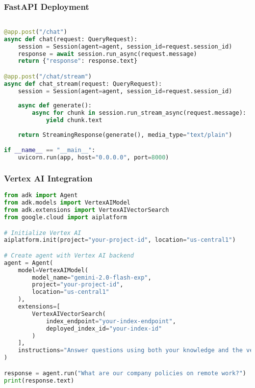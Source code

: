 \begin{frame}[fragile]\frametitle{FastAPI Deployment}
     
      \begin{lstlisting}[language=python, basicstyle=\tiny]

@app.post("/chat")
async def chat(request: QueryRequest):
    session = Session(agent=agent, session_id=request.session_id)
    response = await session.run_async(request.message)
    return {"response": response.text}

@app.post("/chat/stream")
async def chat_stream(request: QueryRequest):
    session = Session(agent=agent, session_id=request.session_id)
    
    async def generate():
        async for chunk in session.run_stream_async(request.message):
            yield chunk.text
    
    return StreamingResponse(generate(), media_type="text/plain")

if __name__ == "__main__":
    uvicorn.run(app, host="0.0.0.0", port=8000)
      \end{lstlisting}
\end{frame}

\begin{frame}[fragile]\frametitle{Vertex AI Integration}
      
      \begin{lstlisting}[language=python, basicstyle=\tiny]
from adk import Agent
from adk.models import VertexAIModel
from adk.extensions import VertexAIVectorSearch
from google.cloud import aiplatform

# Initialize Vertex AI
aiplatform.init(project="your-project-id", location="us-central1")

# Create agent with Vertex AI backend
agent = Agent(
    model=VertexAIModel(
        model_name="gemini-2.0-flash-exp",
        project="your-project-id",
        location="us-central1"
    ),
    extensions=[
        VertexAIVectorSearch(
            index_endpoint="your-index-endpoint",
            deployed_index_id="your-index-id"
        )
    ],
    instructions="Answer questions using both your knowledge and the vector store."
)

response = agent.run("What are our company policies on remote work?")
print(response.text)
      \end{lstlisting}
\end{frame}

